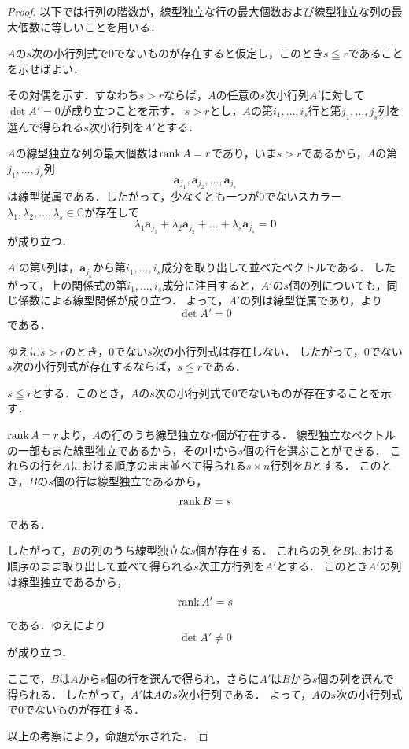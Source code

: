\begin{tleftbar}
\begin{proof}
  以下では行列の階数が，線型独立な行の最大個数および線型独立な列の最大個数に等しいことを用いる．


  $A$の$s$次の小行列式で$0$でないものが存在すると仮定し，このとき$s \leqq r$であることを示せばよい．

  その対偶を示す．すなわち$s > r$ならば，$A$の任意の$s$次小行列$A'$に対して$\det A' = 0$が成り立つことを示す．
  $s > r$とし，$A$の第$i_1,\dots,i_s$行と第$j_1,\dots,j_s$列を選んで得られる$s$次小行列を$A'$とする．

  $A$の線型独立な列の最大個数は$\operatorname{rank} A = r$であり，いま$s > r$であるから，$A$の第$j_1,\dots,j_s$列
  \[
  \bm{a}_{j_1},\bm{a}_{j_2},\dots,\bm{a}_{j_s}
  \]
  は線型従属である．したがって，少なくとも一つが$0$でないスカラー$\lambda_1,\lambda_2,\dots,\lambda_s \in \mathbb{C}$が存在して
  \[
  \lambda_1 \bm{a}_{j_1} + \lambda_2 \bm{a}_{j_2} + \dots + \lambda_s \bm{a}_{j_s} = \bm{0}
  \]
  が成り立つ．

  $A'$の第$k$列は，$\bm{a}_{j_k}$から第$i_1,\dots,i_s$成分を取り出して並べたベクトルである．
  したがって，上の関係式の第$i_1,\dots,i_s$成分に注目すると，$A'$の$s$個の列についても，同じ係数による線型関係が成り立つ．
  よって，$A'$の列は線型従属であり，より
  \[
  \det A' = 0
  \]
  である．

  ゆえに$s > r$のとき，$0$でない$s$次の小行列式は存在しない．
  したがって，$0$でない$s$次の小行列式が存在するならば，$s \leqq r$である．


  $s \leqq r$とする．このとき，$A$の$s$次の小行列式で$0$でないものが存在することを示す．

  $\operatorname{rank} A = r$より，$A$の行のうち線型独立な$r$個が存在する．
  線型独立なベクトルの一部もまた線型独立であるから，その中から$s$個の行を選ぶことができる．
  これらの行を$A$における順序のまま並べて得られる$s \times n$行列を$B$とする．
  このとき，$B$の$s$個の行は線型独立であるから，
  \[
  \operatorname{rank} B = s
  \]
  である．

  したがって，$B$の列のうち線型独立な$s$個が存在する．
  これらの列を$B$における順序のまま取り出して並べて得られる$s$次正方行列を$A'$とする．
  このとき$A'$の列は線型独立であるから，
  \[
  \operatorname{rank} A' = s
  \]
  である．ゆえにより
  \[
  \det A' \ne 0
  \]
  が成り立つ．

  ここで，$B$は$A$から$s$個の行を選んで得られ，さらに$A'$は$B$から$s$個の列を選んで得られる．
  したがって，$A'$は$A$の$s$次小行列である．
  よって，$A$の$s$次の小行列式で$0$でないものが存在する．

  以上の考察により，命題が示された．
\end{proof}
\end{tleftbar}

